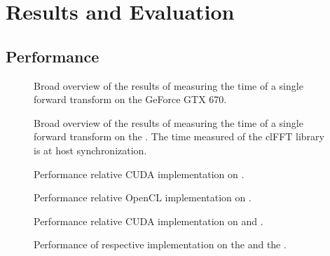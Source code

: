 \chapter{Results and Evaluation}


\section{Performance}


\newcommand{\plotwidth}{{\textwidth} / 2 + 120pt}

\begin{figure}
	\centering
	
	\caption{Broad overview of the results of measuring the time of a single forward transform on the GeForce GTX 670.}
	\label{fig:gtx:overview}
\end{figure}

\begin{figure}
	\centering
	
	\caption{Broad overview of the results of measuring the time of a single forward transform on the \AMDCARD. The time measured of the clFFT library is at host synchronization.}
	\label{fig:r260x:overview}
\end{figure}

\begin{figure}
	\centering
	
	\caption{Performance relative CUDA implementation on \NVCARD.}
	\label{fig:gtx:implementation}
\end{figure}

\begin{figure}
	\centering
	
	\caption{Performance relative OpenCL implementation on \AMDCARD.}
	\label{fig:r260x:implementation}
\end{figure}

\begin{figure}
	\centering
	
	\caption{Performance relative CUDA implementation on \NVCARD and \INTELCPU.}
	\label{fig:gtx:cpu}
\end{figure}

\begin{figure}
	\centering
	
	\caption{Performance of respective implementation on the \AMDCARD and the \NVCARD.}
	\label{fig:gpu-comparison}
\end{figure}

